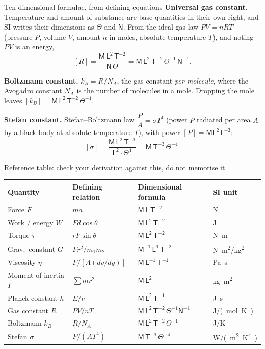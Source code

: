\begin{derivbox}{Ten dimensional formulae, from defining equations}
 \textbf{Universal gas constant.} Temperature and amount of substance are base quantities in
their own right, and SI writes their dimensions as $\Theta$ and $\mathsf{N}$. From the ideal-gas law
$PV=nRT$ (pressure $P$, volume $V$, amount $n$ in moles, absolute temperature $T$), and noting
$PV$ is an energy,
\[
[R]=\frac{\mathsf{M\,L^{2}\,T^{-2}}}{\mathsf{N}\,\Theta}
=\boxed{\mathsf{M\,L^{2}\,T^{-2}}\,\Theta^{-1}\,\mathsf{N}^{-1}}.
\]

 \textbf{Boltzmann constant.} $k_B=R/N_A$, the gas constant \emph{per molecule}, where the Avogadro constant $N_A$ is
the number of molecules in a mole. Dropping the
mole leaves $[k_B]=\boxed{\mathsf{M\,L^{2}\,T^{-2}}\,\Theta^{-1}}$.

 \textbf{Stefan constant.} Stefan--Boltzmann law $\dfrac{P}{A}=\sigma T^{4}$ (power $P$ radiated per area $A$ by a
black body at absolute temperature $T$), with power
$[P]=\mathsf{M L^{2}T^{-3}}$:
\[
[\sigma]=\frac{\mathsf{M\,L^{2}\,T^{-3}}}{\mathsf{L^{2}}\cdot\Theta^{4}}
=\boxed{\mathsf{M\,T^{-3}}\,\Theta^{-4}}.
\]
\end{derivbox}

\begin{tablebox}{Reference table: check your derivation against this, do not memorise it}
\begin{center}
\begin{tabular}{@{}llll@{}}
\toprule
Quantity & Defining relation & Dimensional formula & SI unit\\
\midrule
Force $F$              & $ma$                  & $\mathsf{M\,L\,T^{-2}}$                          & \si{N}\\
Work / energy $W$      & $Fd\cos\theta$        & $\mathsf{M\,L^{2}\,T^{-2}}$                      & \si{J}\\
Torque $\tau$          & $rF\sin\theta$        & $\mathsf{M\,L^{2}\,T^{-2}}$                      & \si{N.m}\\
Grav.\ constant $G$    & $Fr^{2}/m_1m_2$       & $\mathsf{M^{-1}\,L^{3}\,T^{-2}}$                 & \si{N.m^2/kg^2}\\
Viscosity $\eta$       & $F/[A(dv/dy)]$        & $\mathsf{M\,L^{-1}\,T^{-1}}$                     & \si{Pa.s}\\
Moment of inertia $I$  & $\sum mr^{2}$         & $\mathsf{M\,L^{2}}$                              & \si{kg.m^2}\\
Planck constant $h$    & $E/\nu$               & $\mathsf{M\,L^{2}\,T^{-1}}$                      & \si{J.s}\\
Gas constant $R$       & $PV/nT$               & $\mathsf{M\,L^{2}\,T^{-2}}\,\Theta^{-1}\mathsf{N}^{-1}$ & \si{J/(mol.K)}\\
Boltzmann $k_B$        & $R/N_A$               & $\mathsf{M\,L^{2}\,T^{-2}}\,\Theta^{-1}$          & \si{J/K}\\
Stefan $\sigma$        & $P/(AT^{4})$          & $\mathsf{M\,T^{-3}}\,\Theta^{-4}$                 & \si{W/(m^2.K^4)}\\
\bottomrule
\end{tabular}
\end{center}
\end{tablebox}


